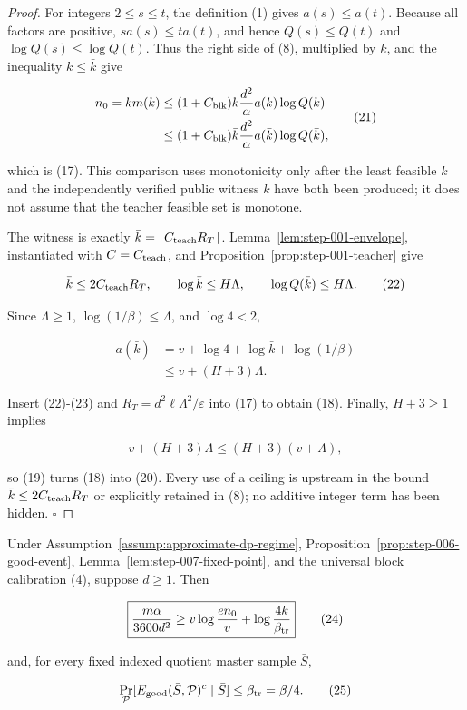 \begin{proof}
For integers \(2\le s\le t\), the definition (1) gives
\(a(s)\le a(t)\). Because all factors are positive,
\(sa(s)\le ta(t)\), and hence \(Q(s)\le Q(t)\) and
\(\log Q(s)\le\log Q(t)\). Thus the right side of (8), multiplied by
\(k\), and the  inequality \(k\le\bar k\) give

\[
\begin{aligned}
 n_0=km(k)
 &\le(1+C_{\rm blk})k\frac{d^2}{\alpha}
      a(k)\log Q(k)\\
 &\le(1+C_{\rm blk})\bar k\frac{d^2}{\alpha}
      a(\bar k)\log Q(\bar k),
\end{aligned}
\tag{21}
\]

which is (17). This comparison uses monotonicity only after the least
feasible \(k\) and the independently verified public witness \(\bar k\)
have both been produced; it does not assume that the teacher feasible set
is monotone.

The  witness is exactly
\(\bar k=\lceil C_{\rm teach}R_T\rceil\). Lemma~\ref{lem:step-001-envelope}, instantiated with
\(C=C_{\rm teach}\), and Proposition~\ref{prop:step-001-teacher} give

\[
 \bar k\le2C_{\rm teach}R_T,
 \qquad
 \log\bar k\le H\Lambda,
 \qquad
 \log Q(\bar k)\le H\Lambda.
\tag{22}
\]

Since \(\Lambda\ge1\), \(\log(1/\beta)\le\Lambda\), and
\(\log4<2\),

\[
\begin{aligned}
 a(\bar k)
 &=v+\log4+\log\bar k+\log(1/\beta)\\
 &\le v+(H+3)\Lambda.
\end{aligned}
\tag{23}
\]

Insert (22)-(23) and
\(R_T=d^2\ell\Lambda^2/\varepsilon\) into (17) to obtain (18).
Finally, \(H+3\ge1\) implies

\[
 v+(H+3)\Lambda\le(H+3)(v+\Lambda),
\]

so (19) turns (18) into (20). Every use of a ceiling is upstream in the
 bound \(\bar k\le2C_{\rm teach}R_T\) or explicitly retained in
(8); no additive integer term has been hidden. \(\square\)


\end{proof}

\begin{proposition}\label{prop:step-007-conditional-charge}
Under Assumption~\ref{assump:approximate-dp-regime}, Proposition~\ref{prop:step-006-good-event},
Lemma~\ref{lem:step-007-fixed-point}, and the universal block calibration
(4), suppose \(d\ge1\). Then

\[
 \boxed{
 \frac{m\alpha}{3600d^2}
 \ge
 v\log\frac{en_0}{v}
 +\log\frac{4k}{\beta_{\rm tr}}
 }
\tag{24}
\]

and, for every fixed indexed quotient master sample \(\bar S\),

\[
 \Pr_{\mathcal P}
 [E_{\rm good}(\bar S,\mathcal P)^c\mid\bar S]
 \le\beta_{\rm tr}=\beta/4.
\tag{25}
\]


\end{proposition}

